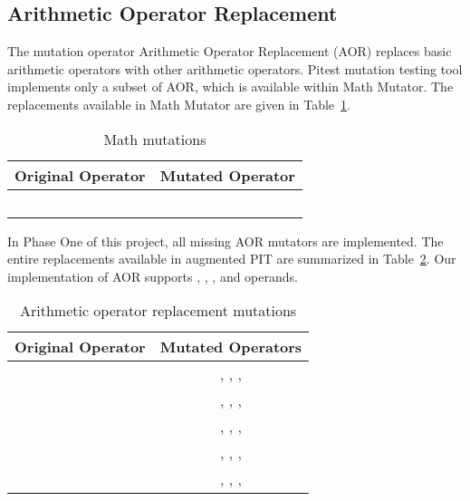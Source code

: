 \subsection{Arithmetic Operator Replacement}
The mutation operator Arithmetic Operator Replacement (AOR) replaces basic arithmetic operators with other arithmetic operators.
Pitest mutation testing tool implements only a subset of AOR, which is available within Math Mutator.
The replacements available in Math Mutator are given in Table~\ref{tab:math:src_ops}.

\begin{table}
  \centering
  \begin{tabular}{c c}
    \toprule
    Original Operator & Mutated Operator \\
    \midrule
    \java{+}          & \java{-}         \\
    \java{-}          & \java{+}         \\
    \java{*}          & \java{/}         \\
    \java{/}          & \java{*}         \\
    \java{\%}         & \java{*}         \\
    \bottomrule
  \end{tabular}
  \caption[Math mutations]{Math mutations}
  \label{tab:math:src_ops}
\end{table}

In Phase One of this project, all missing AOR mutators are implemented.
The entire replacements available in augmented PIT are summarized in Table~\ref{tab:aor:src_ops}.
Our implementation of AOR supports , , , and  operands.

\begin{table}
  \centering
  \begin{tabular}{c c}
    \toprule
    Original Operator & Mutated Operators                                           \\
    \midrule
    \java{+}          & \phantom{\java{+},} \java{-}, \java{*}, \java{/}, \java{\%} \\
    \java{-}          & \java{+}, \phantom{\java{-},} \java{*}, \java{/}, \java{\%} \\
    \java{*}          & \java{+}, \java{-}, \phantom{\java{*},} \java{/}, \java{\%} \\
    \java{/}          & \java{+}, \java{-}, \java{*}, \phantom{\java{/},} \java{\%} \\
    \java{\%}         & \java{+}, \java{-}, \java{*}, \java{/}\phantom{, \java{\%}} \\
    \bottomrule
  \end{tabular}
  \caption[AOR mutations]{Arithmetic operator replacement mutations}
  \label{tab:aor:src_ops}
\end{table}
